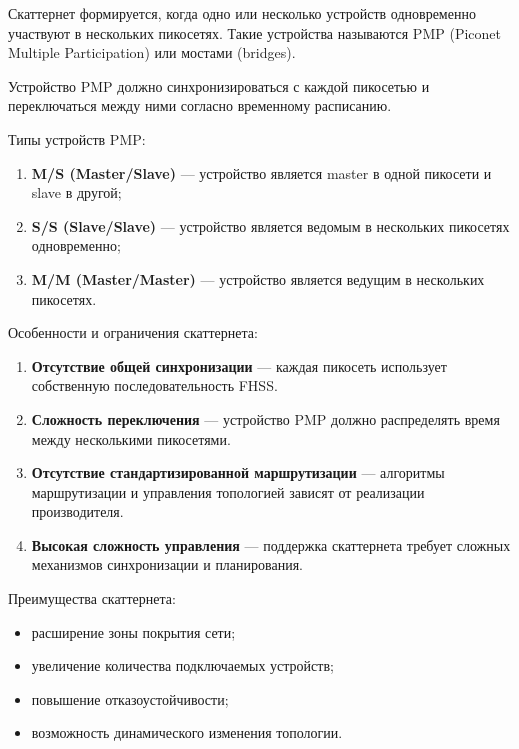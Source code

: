 Скаттернет формируется, когда одно или несколько устройств одновременно участвуют в нескольких пикосетях. Такие устройства называются PMP (Piconet Multiple Participation) или мостами (bridges).

Устройство PMP должно синхронизироваться с каждой пикосетью и переключаться между ними согласно временному расписанию.

Типы устройств PMP:
\begin{enumerate}[nosep]
    \item \textbf{M/S (Master/Slave)} --- устройство является master в одной пикосети и slave в другой;

    \item \textbf{S/S (Slave/Slave)} --- устройство является ведомым в нескольких пикосетях одновременно;

    \item \textbf{M/M (Master/Master)} --- устройство является ведущим в нескольких пикосетях.
\end{enumerate}

Особенности и ограничения скаттернета:
\begin{enumerate}[nosep]
    \item \textbf{Отсутствие общей синхронизации} --- каждая пикосеть использует собственную последовательность FHSS.

    \item \textbf{Сложность переключения} --- устройство PMP должно распределять время между несколькими пикосетями.

    \item \textbf{Отсутствие стандартизированной маршрутизации} --- алгоритмы маршрутизации и управления топологией зависят от реализации производителя.

    \item \textbf{Высокая сложность управления} --- поддержка скаттернета требует сложных механизмов синхронизации и планирования.
\end{enumerate}

Преимущества скаттернета:
\begin{itemize}[nosep]
    \item расширение зоны покрытия сети;
    \item увеличение количества подключаемых устройств;
    \item повышение отказоустойчивости;
    \item возможность динамического изменения топологии.
\end{itemize}

